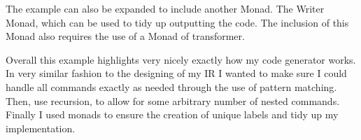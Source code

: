 The example can also be expanded to include another Monad. The Writer Monad, which can be used to tidy up outputting the code. The inclusion of this Monad also requires the use of a Monad of transformer.

Overall this example highlights very nicely exactly how my code generator works. In very similar fashion to the designing of my IR I wanted to make sure I could handle all commands exactly as needed through the use of pattern matching. Then, use recursion, to allow for some arbitrary number of nested commands. Finally I used monads to ensure the creation of unique labels and tidy up my implementation.
  
